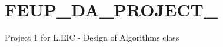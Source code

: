 \chapter{FEUP\+\_\+\+DA\+\_\+\+PROJECT\+\_}
\hypertarget{md__r_e_a_d_m_e}{}\label{md__r_e_a_d_m_e}
\label{md__r_e_a_d_m_e_autotoc_md0}%
%


Project 1 for L.\+EIC -\/ Design of Algorithms class 